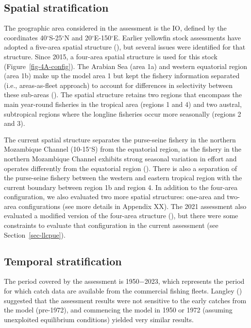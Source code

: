 \documentclass[
]{scrartcl}
\begin{document}
\subsection{Spatial stratification}\label{spatial-stratification}

The geographic area considered in the assessment is the IO, defined by
the coordinates 40\(^\circ\)S-25\(^\circ\)N and
20\(^\circ\)E-150\(^\circ\)E. Earlier yellowfin stock assessments have
adopted a five-area spatial structure
(), but several issues were identified for that
structure. Since 2015, a four-area spatial structure is used for this
stock (Figure~\ref{fig-4A-config}). The Arabian Sea (area 1a) and
western equatorial region (area 1b) make up the model area 1 but kept
the fishery information separated (i.e., areas-as-fleet approach) to
account for differences in selectivity between these sub-areas
(). The spatial
structure retains two regions that encompass the main year-round
fisheries in the tropical area (regions 1 and 4) and two austral,
subtropical regions where the longline fisheries occur more seasonally
(regions 2 and 3).

The current spatial structure separates the purse-seine fishery in the
northern Mozambique Channel (10-15\(^\circ\)S) from the equatorial
region, as the fishery in the northern Mozambique Channel exhibits
strong seasonal variation in effort and operates differently from the
equatorial region
().
There is also a separation of the purse-seine fishery between the
western and eastern tropical region with the current boundary between
region 1b and region 4. In addition to the four-area configuration, we
also evaluated two more spatial structures: one-area and two-area
configurations (see more details in Appendix XX). The 2021 assessment
also evaluated a modified version of the four-area structure
(), but
there were some constraints to evaluate that configuration in the
current assessment (see Section~\ref{sec-llcpue}).

\subsection{Temporal stratification}\label{temporal-stratification}

The period covered by the assessment is 1950−2023, which represents the
period for which catch data are available from the commercial fishing
fleets. Langley
() suggested
that the assessment results were not sensitive to the early catches from
the model (pre-1972), and commencing the model in 1950 or 1972 (assuming
unexploited equilibrium conditions) yielded very similar results.
\end{document}
